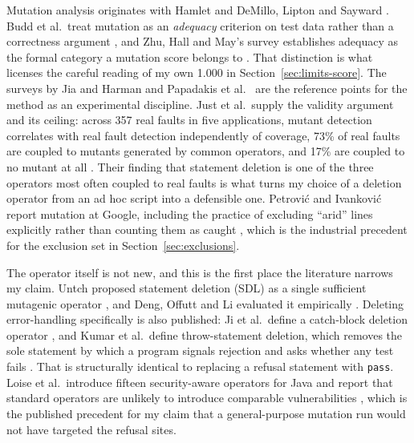 \documentclass[11pt]{article}
\begin{document}
Mutation analysis originates with Hamlet \citep{hamlet1977compiler} and DeMillo, Lipton and
Sayward \citep{demillo1978hints}. Budd et al.\ treat mutation as an \emph{adequacy}
criterion on test data rather than a correctness argument \citep{budd1980theoretical}, and
Zhu, Hall and May's survey establishes adequacy as the formal category a mutation score
belongs to \citep{zhu1997adequacy}. That distinction is what licenses the careful reading of
my own 1.000 in Section~\ref{sec:limits-score}. The surveys by Jia and Harman
\citep{jia2011mutation} and Papadakis et al.\ \citep{papadakis2019mutation} are the
reference points for the method as an experimental discipline. Just et al.\ supply the
validity argument and its ceiling: across 357 real faults in five applications, mutant
detection correlates with real fault detection independently of coverage, 73\% of real
faults are coupled to mutants generated by common operators, and 17\% are coupled to no
mutant at all \citep{just2014mutants}. Their finding that statement deletion is one of the
three operators most often coupled to real faults is what turns my choice of a deletion
operator from an ad hoc script into a defensible one. Petrovi\'c and Ivankovi\'c report
mutation at Google, including the practice of excluding ``arid'' lines explicitly rather
than counting them as caught \citep{petrovic2018google}, which is the industrial precedent
for the exclusion set in Section~\ref{sec:exclusions}.

The operator itself is not new, and this is the first place the literature narrows my claim.
Untch proposed statement deletion (SDL) as a single sufficient mutagenic operator
\citep{untch2009sdl}, and Deng, Offutt and Li evaluated it empirically
\citep{deng2013sdl}. Deleting error-handling specifically is also published: Ji et al.\
define a catch-block deletion operator \citep{ji2009exception}, and Kumar et al.\ define
throw-statement deletion, which removes the sole statement by which a program signals
rejection and asks whether any test fails \citep{kumar2011mutants}. That is structurally
identical to replacing a refusal statement with \texttt{pass}. Loise et al.\ introduce
fifteen security-aware operators for Java and report that standard operators are unlikely to
introduce comparable vulnerabilities \citep{loise2017security}, which is the published
precedent for my claim that a general-purpose mutation run would not have targeted the
refusal sites.
\end{document}
